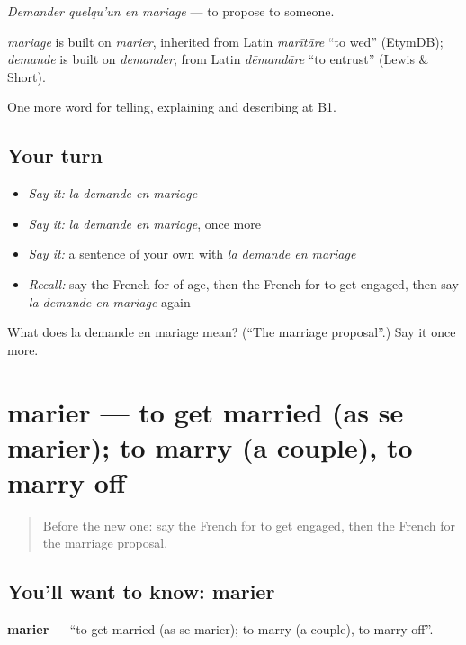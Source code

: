 \emph{Demander quelqu'un en mariage} — to propose to someone.

\begin{cousinweb}
\emph{mariage} is built on \emph{marier}, inherited from Latin \emph{marītāre} \textquotedblleft{}to wed\textquotedblright{} (EtymDB); \emph{demande} is built on \emph{demander}, from Latin \emph{dēmandāre} \textquotedblleft{}to entrust\textquotedblright{} (Lewis \& Short).
\end{cousinweb}

\begin{grammarlens}[title={What you've built}]
One more word for telling, explaining and describing at B1.
\end{grammarlens}

\subsection*{Your turn}
\begin{itemize}
\raggedright
  \item \emph{Say it:} \emph{la demande en mariage}
  \item \emph{Say it:} \emph{la demande en mariage}, once more
  \item \emph{Say it:} a sentence of your own with \emph{la demande en mariage}
  \item \emph{Recall:} say the French for of age, then the French for to get engaged, then say \emph{la demande en mariage} again
\end{itemize}

\begin{tcolorbox}[breakable,colback=teal!4,colframe=teal!35!black,title={Before you move on}]
What does la demande en mariage mean? (\textquotedblleft{}The marriage proposal\textquotedblright{}.) Say it once more.
\end{tcolorbox}
\section[marier]{marier — to get married (as se marier); to marry (a couple), to marry off}

\label{lesson:FR-C311-marier}



\begin{quote}
Before the new one: say the French for to get engaged, then the French for the marriage proposal.
\end{quote}

\subsection*{You'll want to know: marier}
\textbf{marier} — \textquotedblleft{}to get married (as se marier); to marry (a couple), to marry off\textquotedblright{}.

